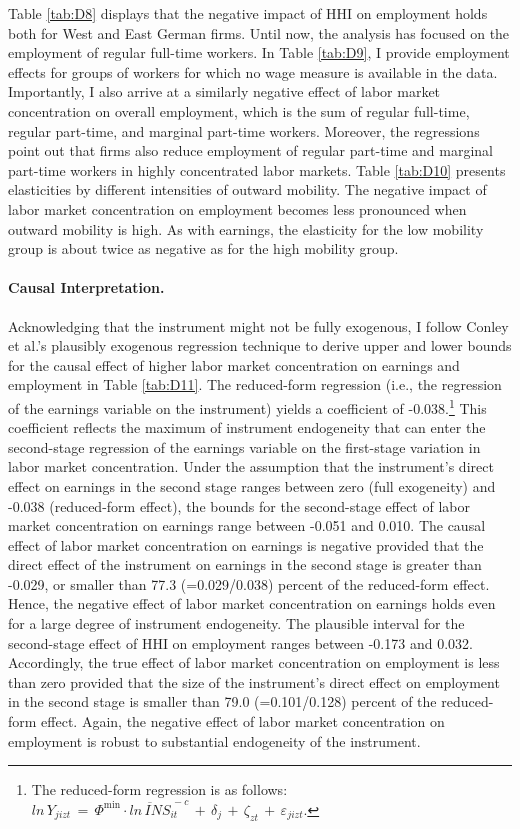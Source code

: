 \documentclass[11pt,oneside,reqno,xcolor=dvipsnames]{article} %
\begin{document}
Table \ref{tab:D8} displays that the negative impact of HHI on employment holds both for West and East German firms. Until now, the analysis has focused on the employment of regular full-time workers. In Table \ref{tab:D9}, I provide employment effects for groups of workers for which no wage measure is available in the data. Importantly, I also arrive at a similarly negative effect of labor market concentration on overall employment, which is the sum of regular full-time, regular part-time, and marginal part-time workers. Moreover, the regressions point out that firms also reduce employment of regular part-time and marginal part-time workers in highly concentrated labor markets. Table \ref{tab:D10} presents elasticities by different intensities of outward mobility. The negative impact of labor market concentration on employment becomes less pronounced when outward mobility is high. As with earnings, the elasticity for the low mobility group is about twice as negative as for the high mobility group.



\paragraph{Causal Interpretation.} Acknowledging that the instrument might not be fully exogenous, I follow Conley et al.'s \citeyearpar{ConleyEtAl2012} plausibly exogenous regression technique to derive upper and lower bounds for the causal effect of higher labor market concentration on earnings and employment in Table \ref{tab:D11}. The reduced-form regression (i.e., the regression of the earnings variable on the instrument) yields a coefficient of -0.038.\footnote{The reduced-form regression is as follows: $ln\,Y_{jizt} \,=\,  \Phi^{\text{min}} \cdot \overline{ln\,I\!N\!S}^{\,-c}_{it}  \,+\, \delta_{j}  \,+\, \zeta_{zt}  \,+\, \varepsilon_{jizt}$.} This coefficient reflects the maximum of instrument endogeneity that can enter the second-stage regression of the earnings variable on the first-stage variation in labor market concentration. Under the assumption that the instrument's direct effect on earnings in the second stage ranges between zero (full exogeneity) and -0.038 (reduced-form effect), the bounds for the second-stage effect of labor market concentration on earnings range between -0.051 and 0.010. The causal effect of labor market concentration on earnings is negative provided that the direct effect of the instrument on earnings in the second stage is greater than -0.029, or smaller than 77.3 (=0.029/0.038) percent of the reduced-form effect. Hence, the negative effect of labor market concentration on earnings holds even for a large degree of instrument endogeneity. The plausible interval for the second-stage effect of HHI on employment ranges between -0.173 and 0.032. Accordingly, the true effect of labor market concentration on employment is less than zero provided that the size of the instrument's direct effect on employment in the second stage is smaller than 79.0 (=0.101/0.128) percent of the reduced-form effect. Again, the negative effect of labor market concentration on employment is robust to substantial endogeneity of the instrument.
\end{document}
